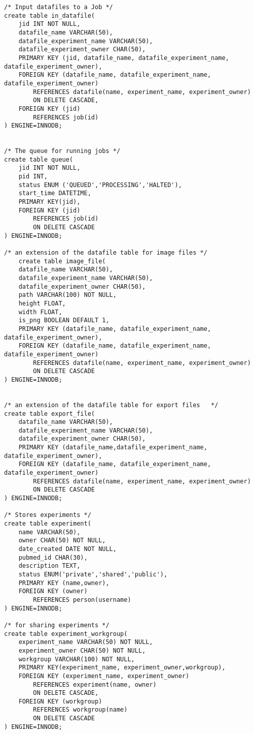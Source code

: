 \begin{tiny}
\begin{verbatim}
/* Input datafiles to a Job */
create table in_datafile(
	jid INT NOT NULL,
	datafile_name VARCHAR(50),
	datafile_experiment_name VARCHAR(50),
	datafile_experiment_owner CHAR(50),
	PRIMARY KEY (jid, datafile_name, datafile_experiment_name, datafile_experiment_owner),
	FOREIGN KEY (datafile_name, datafile_experiment_name, datafile_experiment_owner)
		REFERENCES datafile(name, experiment_name, experiment_owner)
		ON DELETE CASCADE,
	FOREIGN KEY (jid) 
		REFERENCES job(id)
) ENGINE=INNODB;


/* The queue for running jobs */
create table queue(
	jid INT NOT NULL,
	pid INT,
	status ENUM ('QUEUED','PROCESSING','HALTED'),
	start_time DATETIME,
	PRIMARY KEY(jid),
	FOREIGN KEY (jid) 
		REFERENCES job(id)
		ON DELETE CASCADE
) ENGINE=INNODB;

/* an extension of the datafile table for image files */
	create table image_file(
	datafile_name VARCHAR(50),
	datafile_experiment_name VARCHAR(50),
	datafile_experiment_owner CHAR(50),
	path VARCHAR(100) NOT NULL,
	height FLOAT,
	width FLOAT,
	is_png BOOLEAN DEFAULT 1,
	PRIMARY KEY (datafile_name, datafile_experiment_name, datafile_experiment_owner),
	FOREIGN KEY (datafile_name, datafile_experiment_name, datafile_experiment_owner)
		REFERENCES datafile(name, experiment_name, experiment_owner)
		ON DELETE CASCADE
) ENGINE=INNODB;


/* an extension of the datafile table for export files   */
create table export_file(
	datafile_name VARCHAR(50),
	datafile_experiment_name VARCHAR(50),
	datafile_experiment_owner CHAR(50),
	PRIMARY KEY (datafile_name,datafile_experiment_name, datafile_experiment_owner),
	FOREIGN KEY (datafile_name, datafile_experiment_name, datafile_experiment_owner)
		REFERENCES datafile(name, experiment_name, experiment_owner)
		ON DELETE CASCADE
) ENGINE=INNODB;

/* Stores experiments */
create table experiment(
	name VARCHAR(50),
	owner CHAR(50) NOT NULL,
	date_created DATE NOT NULL,
	pubmed_id CHAR(30),
	description TEXT,
	status ENUM('private','shared','public'),
	PRIMARY KEY (name,owner),
	FOREIGN KEY (owner) 
		REFERENCES person(username)
) ENGINE=INNODB;
	
/* for sharing experiments */
create table experiment_workgroup(
	experiment_name VARCHAR(50) NOT NULL,
	experiment_owner CHAR(50) NOT NULL,
	workgroup VARCHAR(100) NOT NULL,
	PRIMARY KEY(experiment_name, experiment_owner,workgroup),
	FOREIGN KEY (experiment_name, experiment_owner)
		REFERENCES experiment(name, owner)
		ON DELETE CASCADE,
	FOREIGN KEY (workgroup)
		REFERENCES workgroup(name)
		ON DELETE CASCADE
) ENGINE=INNODB;



\end{verbatim}
\end{tiny}
